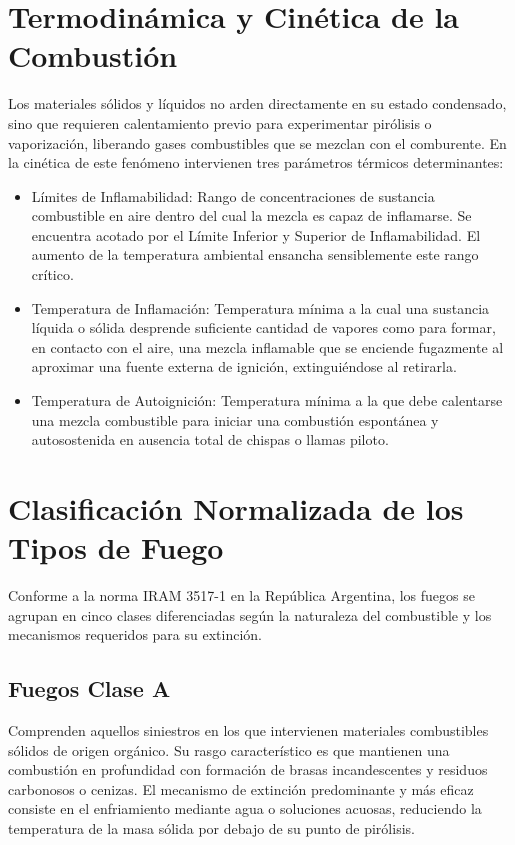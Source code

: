 \section{Termodinámica y Cinética de la Combustión}

Los materiales sólidos y líquidos no arden directamente en su estado condensado, sino que requieren calentamiento previo
para experimentar pirólisis o vaporización, liberando gases combustibles que se mezclan con el comburente. En la cinética
de este fenómeno intervienen tres parámetros térmicos determinantes:
\begin{itemize}
    \item Límites de Inflamabilidad: Rango de concentraciones de sustancia combustible en aire dentro del cual la mezcla
      es capaz de inflamarse. Se encuentra acotado por el Límite Inferior y Superior de Inflamabilidad. El aumento de la
      temperatura ambiental ensancha sensiblemente este rango crítico.
    \item Temperatura de Inflamación: Temperatura mínima a la cual una sustancia líquida o sólida
      desprende suficiente cantidad de vapores como para formar, en contacto con el aire, una mezcla inflamable que se
      enciende fugazmente al aproximar una fuente externa de ignición, extinguiéndose al retirarla.
    \item Temperatura de Autoignición: Temperatura mínima a la que debe calentarse una mezcla
      combustible para iniciar una combustión espontánea y autosostenida en ausencia total de chispas o llamas piloto.
\end{itemize}

\section{Clasificación Normalizada de los Tipos de Fuego}
\label{sec.cap2:clases_fuego}

Conforme a la norma IRAM 3517-1 en la República Argentina, los fuegos se
agrupan en cinco clases diferenciadas según la naturaleza del combustible y los mecanismos requeridos para su extinción.

\subsection{Fuegos Clase A}
Comprenden aquellos siniestros en los que intervienen materiales combustibles sólidos de origen orgánico. Su rasgo
característico es que mantienen una combustión en profundidad con formación de brasas incandescentes y residuos
carbonosos o cenizas. El mecanismo de extinción predominante y más eficaz consiste en el enfriamiento mediante agua o
soluciones acuosas, reduciendo la temperatura de la masa sólida por debajo de su punto de pirólisis.

